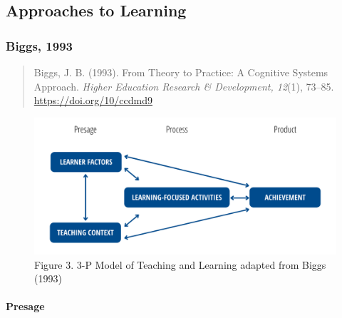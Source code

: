 \documentclass[
]{book}
\begin{document}
\hypertarget{approaches-to-learning}{%
\subsection*{Approaches to Learning}\label{approaches-to-learning}}

\hypertarget{biggs-1993}{%
\subsubsection*{Biggs, 1993}\label{biggs-1993}}

\begin{quote}
Biggs, J. B. (1993). From Theory to Practice: A Cognitive Systems Approach. \emph{Higher Education Research \& Development, 12}(1), 73--85. \url{https://doi.org/10/ccdmd9}
\end{quote}

\begin{figure}
\centering
\includegraphics{assets/otessa22/3p-model.png}
\caption{Figure 3. 3-P Model of Teaching and Learning adapted from Biggs (1993)}
\end{figure}

\hypertarget{presage}{%
\paragraph*{Presage}\label{presage}}
\end{document}

